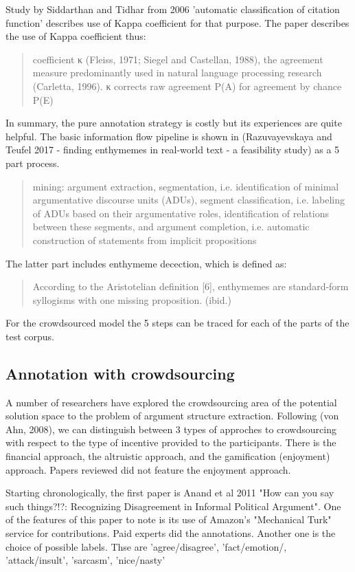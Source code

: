 \documentclass{article}
\begin{document}
Study by Siddarthan and Tidhar from 2006 'automatic classification of citation function' describes use of Kappa coefficient for that purpose.
The paper describes the use of Kappa coefficient thus:
\begin{quote}
  coefficient κ (Fleiss, 1971; Siegel and Castellan, 1988), the agreement measure predominantly used in natural language processing research (Carletta, 1996). κ corrects raw agreement P(A) for agreement by chance P(E)
\end{quote}

In summary, the pure annotation strategy is costly but its experiences are quite helpful. The basic information flow pipeline is shown in (Razuvayevskaya and Teufel 2017 - finding enthymemes in real-world text - a feasibility study) as a 5 part process.
\begin{quote}
   mining: argument extraction, segmentation, i.e. identification of minimal argumentative discourse units (ADUs), segment classification, i.e. labeling of ADUs based on their argumentative roles, identification of relations between these segments, and argument completion, i.e. automatic construction of statements from implicit propositions
\end{quote}

The latter part includes enthymeme decection, which is defined as:
\begin{quote}
According to the Aristotelian definition [6], enthymemes are standard-form syllogisms with one missing proposition.  (ibid.)
\end{quote}

For the crowdsourced model the 5 steps can be traced for each of the parts of the test corpus. 

\subsection{Annotation with crowdsourcing}
A number of researchers have explored the crowdsourcing area of the potential solution space to the problem of argument structure extraction.
Following (von Ahn, 2008), we can distinguish between 3 types of approches to crowdsourcing with respect to the type of incentive provided to the participants.
There is the financial approach, the altruistic approach, and the gamification (enjoyment) approach. Papers reviewed did not feature the enjoyment approach.

Starting chronologically, the first paper is Anand et al 2011 "How can you say such things?!?: Recognizing Disagreement in Informal Political Argument".
One of the features of this paper to note is its use of Amazon's "Mechanical Turk" service for contributions. Paid experts did the annotations.
Another one is the choice of possible labels. Thse are 'agree/disagree', 'fact/emotion/, 'attack/insult', 'sarcasm', 'nice/nasty'
\end{document}
